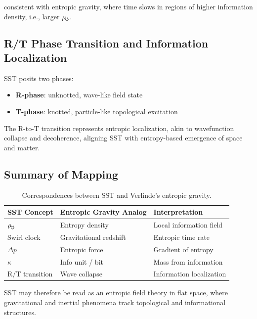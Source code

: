 \documentclass[11pt]{article}
\newcommand{\swirlarrow}{%
    \mathchoice{\mkern-2mu\scriptstyle\boldsymbol{\circlearrowleft}}%
    {\mkern-2mu\scriptstyle\boldsymbol{\circlearrowleft}}%
    {\mkern-2mu\scriptscriptstyle\boldsymbol{\circlearrowleft}}%
    {\mkern-2mu\scriptscriptstyle\boldsymbol{\circlearrowleft}}%
}
\begin{document}
        consistent with entropic gravity, where time slows in regions of higher information density, i.e., larger $\rho_{\swirlarrow}$.

    \subsection{R/T Phase Transition and Information Localization}
        SST posits two phases:
        \begin{itemize}
        \item \textbf{R-phase}: unknotted, wave-like field state
        \item \textbf{T-phase}: knotted, particle-like topological excitation
        \end{itemize}

        The R-to-T transition represents entropic localization, akin to wavefunction collapse and decoherence, aligning SST with entropy-based emergence of space and matter.

    \subsection{Summary of Mapping}
        \begin{table}[h]
            \centering
            \begin{tabular}{lll}
                \toprule
                \textbf{SST Concept} & \textbf{Entropic Gravity Analog} & \textbf{Interpretation} \\
                \midrule
                $\rho_{\swirlarrow}$ & Entropy density & Local information field \\
                Swirl clock & Gravitational redshift & Entropic time rate \\
                $\Delta p$ & Entropic force & Gradient of entropy \\
                $\kappa$ & Info unit / bit & Mass from information \\
                R/T transition & Wave collapse & Information localization \\
                \bottomrule
            \end{tabular}
            \caption{Correspondences between SST and Verlinde's entropic gravity.}\label{tab:sst-entropic-mapping}
        \end{table}

        SST may therefore be read as an entropic field theory in flat space, where gravitational and inertial phenomena track topological and informational structures.
\end{document}
